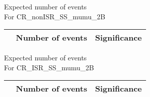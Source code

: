 \begin{frame}{Expected number of events \\ For CR\_nonISR\_SS\_mumu\_2B}
\vspace{5mm}
\begin{tabular}{|c|c|c|}
\hline
& Number of events & Significance \\
\hline

\end{tabular}
\end{frame}

\begin{frame}{Expected number of events \\ For CR\_ISR\_SS\_mumu\_2B}
\vspace{5mm}
\begin{tabular}{|c|c|c|}
\hline
& Number of events & Significance \\
\hline

\end{tabular}
\end{frame}

